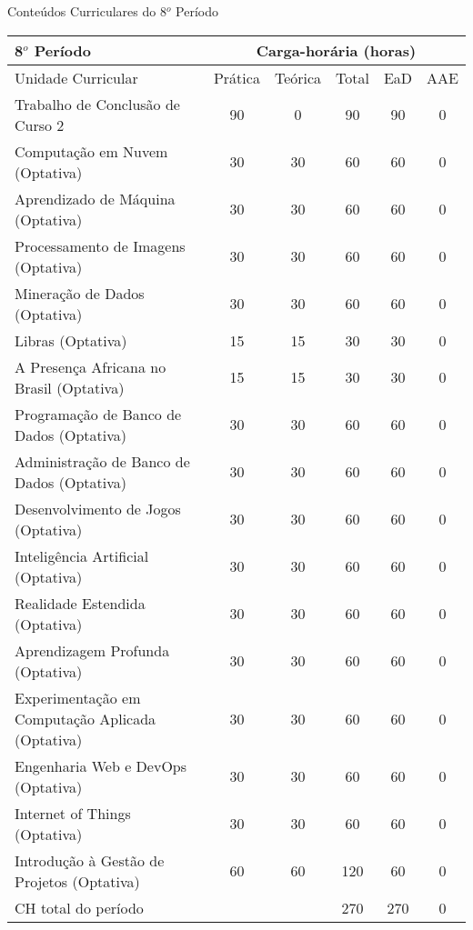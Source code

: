 \begin{quadro}[ht!]
\centering
\caption{Conteúdos Curriculares do 8$^o$ Período}\label{qua:periodo8}
\begin{tabular}{|p{8.0cm}|c|c|c|c|c|}
\hline
\rowcolor{blue1} 8$^o$ Período & \multicolumn{5}{|c|}{\centering Carga-horária (horas)} \\ \hline
\rowcolor{blue1} Unidade Curricular & Prática & Teórica & Total & EaD & AAE \\ \hline
Trabalho de Conclusão de Curso 2 & 90 & 0 & 90 & 90	&	0 \\	\hline
Computação em Nuvem (Optativa) & 30 & 30 & 60 & 60	&	0 \\	\hline
Aprendizado de Máquina (Optativa) & 30 & 30 & 60 & 60	&	0 \\	\hline
Processamento de Imagens (Optativa) & 30 & 30 & 60 & 60	&	0 \\	\hline
Mineração de Dados (Optativa) & 30 & 30 & 60 & 60	&	0 \\	\hline
Libras (Optativa) & 15 & 15 & 30 & 30	&	0 \\	\hline
A Presença Africana no Brasil (Optativa) & 15 & 15 & 30 & 30	&	0 \\	\hline
Programação de Banco de Dados (Optativa) & 30 & 30 & 60 & 60	&	0 \\	\hline
Administração de Banco de Dados (Optativa) & 30 & 30 & 60 & 60	&	0 \\	\hline
Desenvolvimento de Jogos (Optativa) & 30 & 30 & 60 & 60	&	0 \\	\hline
Inteligência Artificial (Optativa) & 30 & 30 & 60 & 60	&	0 \\	\hline
Realidade Estendida (Optativa) & 30 & 30 & 60 & 60	&	0 \\	\hline
Aprendizagem Profunda (Optativa) & 30 & 30 & 60 & 60	&	0 \\	\hline
Experimentação em Computação Aplicada (Optativa) & 30 & 30 & 60 & 60	&	0 \\	\hline
Engenharia Web e DevOps (Optativa) & 30 & 30 & 60 & 60	&	0 \\	\hline
Internet of Things (Optativa) & 30 & 30 & 60 & 60	&	0 \\	\hline
Introdução à Gestão de Projetos (Optativa) & 60 & 60 & 120 & 60	&	0 \\	\hline
CH total do período & \multicolumn{2}{p{3.3cm}|}{\cellcolor{blue1}} & 270 & 270	&	0 \\ \hline
\end{tabular} \end{quadro}